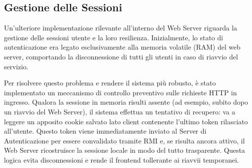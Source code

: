 \subsection{Gestione delle Sessioni}
Un'ulteriore implementazione rilevante all'interno del Web Server riguarda la gestione delle sessioni utente e la loro resilienza. Inizialmente, lo stato di autenticazione era legato esclusivamente alla memoria volatile (RAM) del web server, comportando la disconnessione di tutti gli utenti in caso di riavvio del servizio. 

Per risolvere questo problema e rendere il sistema più robusto, è stato implementato un meccanismo di controllo preventivo sulle richieste HTTP in ingresso. Qualora la sessione in memoria risulti assente (ad esempio, subito dopo un riavvio del Web Server), il sistema effettua un tentativo di recupero: va a leggere un apposito cookie salvato lato client contenente l'ultimo token rilasciato all'utente. Questo token viene immediatamente inviato al Server di Autenticazione per essere convalidato tramite RMI e, se risulta ancora attivo, il Web Server ricostruisce la sessione locale in modo del tutto trasparente. Questa logica evita disconnessioni e rende il frontend tollerante ai riavvii temporanei.